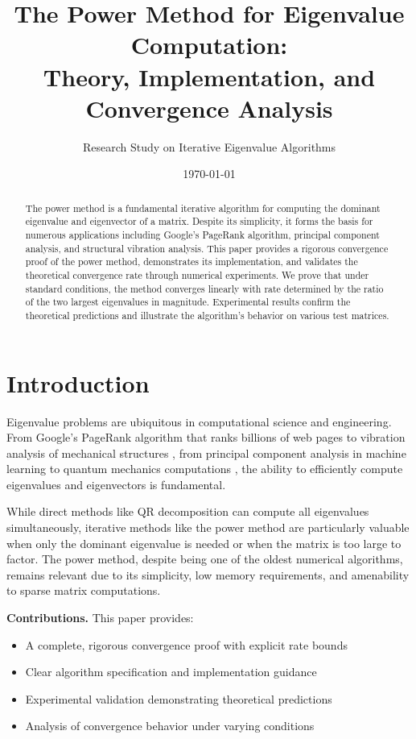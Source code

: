 \documentclass[11pt,a4paper]{article}
\title{\textbf{The Power Method for Eigenvalue Computation: \\Theory, Implementation, and Convergence Analysis}}
\author{Research Study on Iterative Eigenvalue Algorithms}
\date{\today}
\begin{document}
\maketitle

\begin{abstract}
The power method is a fundamental iterative algorithm for computing the dominant eigenvalue and eigenvector of a matrix. Despite its simplicity, it forms the basis for numerous applications including Google's PageRank algorithm, principal component analysis, and structural vibration analysis. This paper provides a rigorous convergence proof of the power method, demonstrates its implementation, and validates the theoretical convergence rate through numerical experiments. We prove that under standard conditions, the method converges linearly with rate determined by the ratio of the two largest eigenvalues in magnitude. Experimental results confirm the theoretical predictions and illustrate the algorithm's behavior on various test matrices.
\end{abstract}

\section{Introduction}

Eigenvalue problems are ubiquitous in computational science and engineering. From Google's PageRank algorithm that ranks billions of web pages \cite{page1999pagerank} to vibration analysis of mechanical structures \cite{bathe2006finite}, from principal component analysis in machine learning \cite{jolliffe2016principal} to quantum mechanics computations \cite{golub2013matrix}, the ability to efficiently compute eigenvalues and eigenvectors is fundamental.

While direct methods like QR decomposition can compute all eigenvalues simultaneously, iterative methods like the power method are particularly valuable when only the dominant eigenvalue is needed or when the matrix is too large to factor. The power method, despite being one of the oldest numerical algorithms, remains relevant due to its simplicity, low memory requirements, and amenability to sparse matrix computations.

\textbf{Contributions.} This paper provides:
\begin{itemize}
    \item A complete, rigorous convergence proof with explicit rate bounds
    \item Clear algorithm specification and implementation guidance
    \item Experimental validation demonstrating theoretical predictions
    \item Analysis of convergence behavior under varying conditions
\end{itemize}
\end{document}
